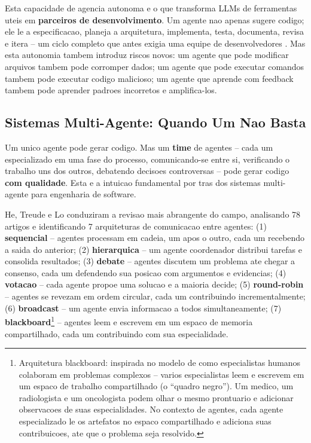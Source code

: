 \documentclass[12pt,a4paper,oneside,sumario=tradicional,chapter=TITLE,section=TITLE,subsection=TITLE,english,brazil]{abntex2}
\begin{document}
Esta capacidade de agencia autonoma e o que transforma LLMs de ferramentas uteis em \textbf{parceiros de desenvolvimento}. Um agente nao apenas sugere codigo; ele le a especificacao, planeja a arquitetura, implementa, testa, documenta, revisa e itera -- um ciclo completo que antes exigia uma equipe de desenvolvedores \cite{hou2024large}. Mas esta autonomia tambem introduz riscos novos: um agente que pode modificar arquivos tambem pode corromper dados; um agente que pode executar comandos tambem pode executar codigo malicioso; um agente que aprende com feedback tambem pode aprender padroes incorretos e amplifica-los.

\subsection{Sistemas Multi-Agente: Quando Um Nao Basta}

Um unico agente pode gerar codigo. Mas um \textbf{time} de agentes -- cada um especializado em uma fase do processo, comunicando-se entre si, verificando o trabalho uns dos outros, debatendo decisoes controversas -- pode gerar codigo \textbf{com qualidade}. Esta e a intuicao fundamental por tras dos sistemas multi-agente para engenharia de software.

He, Treude e Lo \cite{he2025llm} conduziram a revisao mais abrangente do campo, analisando 78 artigos e identificando 7 arquiteturas de comunicacao entre agentes: (1) \textbf{sequencial} -- agentes processam em cadeia, um apos o outro, cada um recebendo a saida do anterior; (2) \textbf{hierarquica} -- um agente coordenador distribui tarefas e consolida resultados; (3) \textbf{debate} -- agentes discutem um problema ate chegar a consenso, cada um defendendo sua posicao com argumentos e evidencias; (4) \textbf{votacao} -- cada agente propoe uma solucao e a maioria decide; (5) \textbf{round-robin} -- agentes se revezam em ordem circular, cada um contribuindo incrementalmente; (6) \textbf{broadcast} -- um agente envia informacao a todos simultaneamente; (7) \textbf{blackboard}\footnote{Arquitetura blackboard: inspirada no modelo de como especialistas humanos colaboram em problemas complexos -- varios especialistas leem e escrevem em um espaco de trabalho compartilhado (o ``quadro negro''). Um medico, um radiologista e um oncologista podem olhar o mesmo prontuario e adicionar observacoes de suas especialidades. No contexto de agentes, cada agente especializado le os artefatos no espaco compartilhado e adiciona suas contribuicoes, ate que o problema seja resolvido.} -- agentes leem e escrevem em um espaco de memoria compartilhado, cada um contribuindo com sua especialidade.
\end{document}
